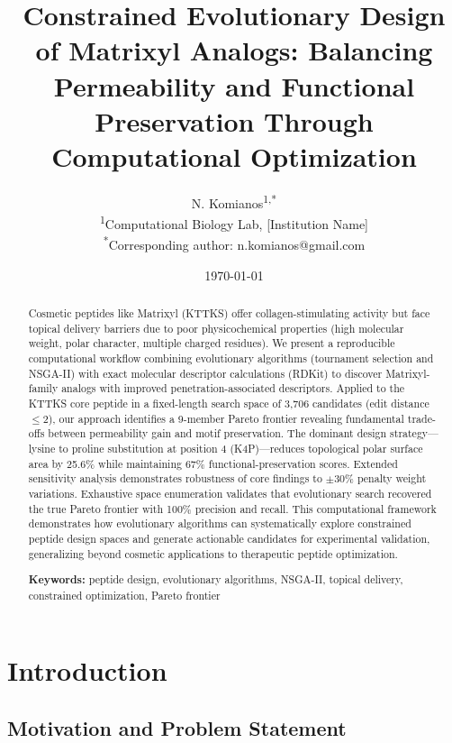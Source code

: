 \documentclass[11pt,a4paper]{article}
\title{Constrained Evolutionary Design of Matrixyl Analogs: Balancing Permeability and Functional Preservation Through Computational Optimization}
\author{%
  N. Komianos\textsuperscript{1,*}\\
  \textsuperscript{1}Computational Biology Lab, [Institution Name]\\
  \textsuperscript{*}Corresponding author: n.komianos@gmail.com
}
\date{\today}
\begin{document}
\maketitle

\begin{abstract}
Cosmetic peptides like Matrixyl (KTTKS) offer collagen-stimulating activity but face topical delivery barriers due to poor physicochemical properties (high molecular weight, polar character, multiple charged residues). We present a reproducible computational workflow combining evolutionary algorithms (tournament selection and NSGA-II) with exact molecular descriptor calculations (RDKit) to discover Matrixyl-family analogs with improved penetration-associated descriptors. Applied to the KTTKS core peptide in a fixed-length search space of 3,706 candidates (edit distance $\leq 2$), our approach identifies a 9-member Pareto frontier revealing fundamental trade-offs between permeability gain and motif preservation. The dominant design strategy---lysine to proline substitution at position 4 (K4P)---reduces topological polar surface area by 25.6\% while maintaining 67\% functional-preservation scores. Extended sensitivity analysis demonstrates robustness of core findings to $\pm 30\%$ penalty weight variations. Exhaustive space enumeration validates that evolutionary search recovered the true Pareto frontier with 100\% precision and recall. This computational framework demonstrates how evolutionary algorithms can systematically explore constrained peptide design spaces and generate actionable candidates for experimental validation, generalizing beyond cosmetic applications to therapeutic peptide optimization.

\smallskip
\noindent
\textbf{Keywords:} peptide design, evolutionary algorithms, NSGA-II, topical delivery, constrained optimization, Pareto frontier
\end{abstract}

\newpage
\tableofcontents
\newpage

\section{Introduction}

\subsection{Motivation and Problem Statement}
\end{document}
